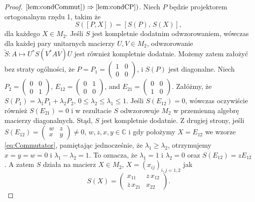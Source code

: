 \begin{proof}
$\ref{lem:condCommut}) \Rightarrow \ref{lem:condCP})$.
Niech $P$ będzie projektorem ortogonalnym rzędu 1, takim że
\begin{equation}
\label{eq:Commutator}
S([P,X]) = [S(P), \, S(X)],
\end{equation}
dla każdego $X \in M_{2}$.
Jeśli $S$ jest kompletnie dodatnim odwzorowaniem, wówczas dla każdej pary
unitarnych macierzy $U, V \in M_{2}$,
odwzorowanie $\tilde{S}: A \mapsto U^{*} S(V^{*} A V) U$
jest również kompletnie dodatnie.
Możemy zatem założyć bez straty ogólności, że
$P = P_{1} =
\left(
\begin{smallmatrix} 1 & 0 \\ 0 & 0 \end{smallmatrix}
\right)$,
i $S(P)$ jest diagonalne.
Niech $P_{2} = \left(
\begin{smallmatrix} 0 & 0 \\ 0 & 1 \end{smallmatrix}
\right)$,
$E_{12} =
\left(
\begin{smallmatrix} 0 & 1 \\ 0 & 0 \end{smallmatrix}
\right)$,
and
$E_{21} =
\left(
\begin{smallmatrix} 0 & 0 \\ 1 & 0 \end{smallmatrix}
\right)$.
Załóżmy, że
$S(P_{1}) = \lambda_{1} P_{1} + \lambda_{2} P_{2}$,
$0 \leq \lambda_{2} \leq \lambda_{1} \leq 1$.
Jeśli $S(E_{12}) = 0$,
wówczas oczywiście również $S(E_{21}) = 0$ i w rezultacie
$S$ odwzorowuje $M_{2}$
w przemienną algebrę macierzy diagonalnych.
Stąd, $S$ jest kompletnie dodatnie.
Z drugiej strony, jeśli
$S(E_{12}) =
\left(
\begin{smallmatrix} w & z \\ x & y \end{smallmatrix}
\right) \neq 0$,
$w, z, x, y \in \mathbb{C}$
i gdy położymy $X = E_{12}$ we wzorze \eqref{eq:Commutator},
pamiętając jednocześnie, że $\lambda_{1} \geq \lambda_{2}$,
otrzymujemy $x = y = w = 0$ i $\lambda_{1} - \lambda_{2} = 1$.
To oznacza, że $\lambda_{1} = 1$ i $\lambda_{2} = 0$ oraz
$S(E_{12}) = z E_{12}$.
A zatem $S$ działa na macierz
$X \in M_{2}$, $X = (x_{ij})_{i,j=1,2}$ jak
\begin{equation}
S(X) = \begin{pmatrix}
 x_{11} & z \, x_{12} \\
\overline{z} \, x_{21} & x_{22}
\end{pmatrix}.
\end{equation}

\end{proof}
